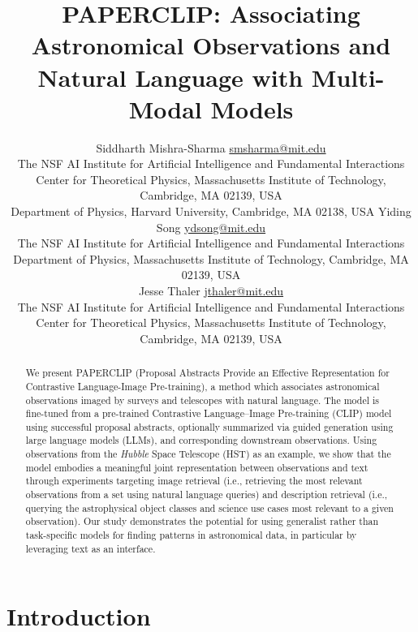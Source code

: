 \documentclass[10pt]{article} %
\title{\textsc{PAPERCLIP}: Associating Astronomical Observations and Natural Language with Multi-Modal Models}
\author{\name Siddharth Mishra-Sharma \email \href{mailto:smsharma@mit.edu}{smsharma@mit.edu} \\
      \addr The NSF AI Institute for Artificial Intelligence and Fundamental Interactions\\
      Center for Theoretical Physics, Massachusetts Institute of Technology, Cambridge, MA 02139, USA \\
      Department of Physics, Harvard University, Cambridge, MA 02138, USA
      \AND
      \name Yiding Song \email \href{mailto:ydsong@mit.edu}{ydsong@mit.edu} \\
      \addr The NSF AI Institute for Artificial Intelligence and Fundamental Interactions\\
      Department of Physics, Massachusetts Institute of Technology, Cambridge, MA 02139, USA \\
      \AND
      \name Jesse Thaler \email \href{mailto:jthaler@mit.edu}{jthaler@mit.edu} \\
      \addr The NSF AI Institute for Artificial Intelligence and Fundamental Interactions\\
      Center for Theoretical Physics, Massachusetts Institute of Technology, Cambridge, MA 02139, USA \\
}
\newcommand{\githubmaster}{\href{https://github.com/smsharma/HubbleCLIP}{\faGithub}\xspace}
\newcommand{\SM}[1]{\textcolor{blue}{[SM: #1]}}
\newcommand{\hubble}{\emph{Hubble}\xspace}
\begin{document}
\maketitle

\thispagestyle{firstpage}

\begin{abstract}
We present PAPERCLIP (Proposal Abstracts Provide an Effective Representation for Contrastive Language-Image Pre-training), a method which associates astronomical observations imaged by surveys and telescopes with natural language. The model is fine-tuned from a pre-trained Contrastive Language–Image Pre-training (CLIP) model using successful proposal abstracts, optionally summarized via guided generation using large language models (LLMs), and corresponding downstream observations. Using observations from the \hubble Space Telescope (HST) as an example, we show that the model embodies a meaningful joint representation between observations and text through experiments targeting image retrieval (i.e., retrieving the most relevant observations from a set using natural language queries) and description retrieval (i.e., querying the astrophysical object classes and science use cases most relevant to a given observation). Our study demonstrates the potential for using generalist rather than task-specific models for finding patterns in astronomical data, in particular by leveraging text as an interface. \githubmaster
\end{abstract}

\tableofcontents

\section{Introduction}
\label{sec:intro}

\end{document}
